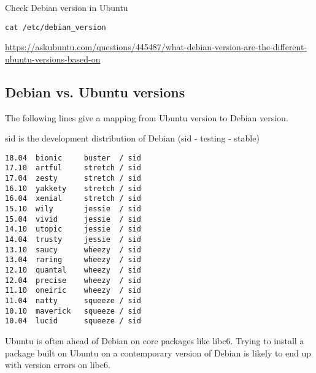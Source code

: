 Check Debian version in Ubuntu
\begin{verbatim}
cat /etc/debian_version
\end{verbatim}
\url{https://askubuntu.com/questions/445487/what-debian-version-are-the-different-ubuntu-versions-based-on}

\subsection{Debian vs. Ubuntu versions}
\label{sec:Debian-versions}

The following lines give a mapping from Ubuntu version to Debian version.

sid is the development distribution of Debian (sid - testing - stable)
\begin{verbatim}
18.04  bionic     buster  / sid
17.10  artful     stretch / sid
17.04  zesty      stretch / sid
16.10  yakkety    stretch / sid
16.04  xenial     stretch / sid
15.10  wily       jessie  / sid
15.04  vivid      jessie  / sid
14.10  utopic     jessie  / sid
14.04  trusty     jessie  / sid
13.10  saucy      wheezy  / sid
13.04  raring     wheezy  / sid
12.10  quantal    wheezy  / sid
12.04  precise    wheezy  / sid
11.10  oneiric    wheezy  / sid
11.04  natty      squeeze / sid
10.10  maverick   squeeze / sid
10.04  lucid      squeeze / sid
\end{verbatim}

Ubuntu is often ahead of Debian on core packages like libc6. Trying to install a
package built on Ubuntu on a contemporary version of Debian is likely to end up
with version errors on libc6.



